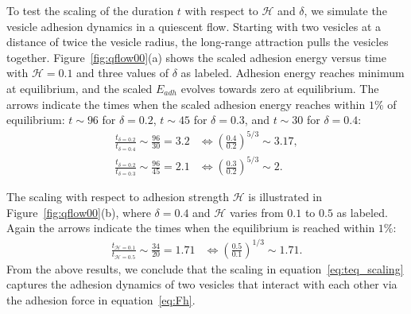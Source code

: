 \documentclass[prf,superscriptaddress,showkeys,longbibliography]{revtex4-1}
\begin{document}
To test the scaling of the duration $t$ with respect to $\mathcal{H}$
and $\delta$, we simulate the vesicle adhesion dynamics in a quiescent
flow.  Starting with two vesicles at a distance of twice the vesicle
radius, the long-range attraction pulls the vesicles together.
Figure~\ref{fig:qflow00}(a) shows the scaled adhesion energy versus time
with $\mathcal{H}=0.1$ and three values of $\delta$ as labeled.
Adhesion energy reaches minimum at equilibrium, and the scaled $E_{adh}$
evolves towards zero at equilibrium.  The arrows indicate the times when
the scaled adhesion energy reaches within $1\%$ of equilibrium: $t\sim
96$ for $\delta=0.2$, $t\sim 45$ for $\delta = 0.3$, and $t\sim 30$ for
$\delta=0.4$:
\begin{align*}
\frac{t_{\delta=0.2}}{t_{\delta=0.4}} \sim \frac{96}{30}=3.2 
  &\Longleftrightarrow \left(\frac{0.4}{0.2}\right)^{5/3}\sim 3.17,\\
\frac{t_{\delta=0.2}}{t_{\delta=0.3}} \sim \frac{96}{45}=2.1 
  &\Longleftrightarrow \left(\frac{0.3}{0.2}\right)^{5/3}\sim 2.
\end{align*}

The scaling with respect to adhesion strength $\mathcal{H}$ is
illustrated in Figure~\ref{fig:qflow00}(b), where $\delta = 0.4$ and
$\mathcal{H}$ varies from $0.1$ to $0.5$ as labeled.  Again the arrows
indicate the times when the equilibrium is reached within $1\%$:
\begin{align*}
  \frac{t_{\mathcal{H}=0.1}}{t_{\mathcal{H}=0.5}} \sim \frac{34}{20} = 1.71 
  &\Longleftrightarrow \left(\frac{0.5}{0.1}\right)^{1/3}\sim 1.71.
\end{align*}
From the above results, we conclude that the scaling in
equation~\eqref{eq:teq_scaling} captures the adhesion dynamics of two
vesicles that interact with each other via the adhesion force in
equation~\eqref{eq:Fh}.

\end{document}
